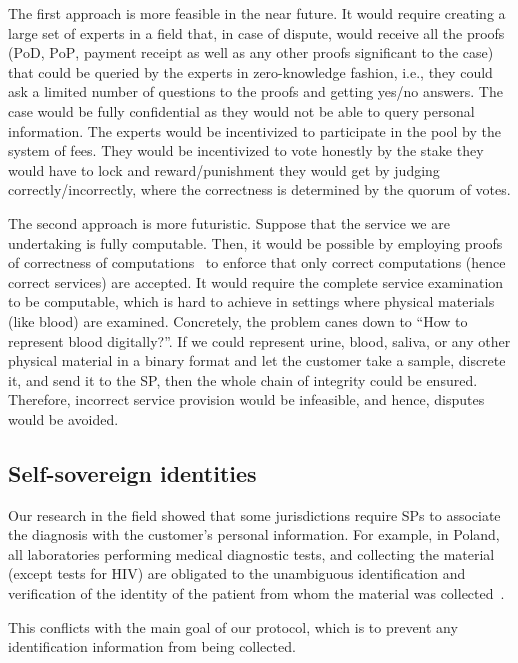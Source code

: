 \documentclass[pdftex,twocolumn,epjc3]{svjour3}
\begin{document}
{The first approach is more feasible in the near future. It would require creating a large set of experts in a field that, in case of dispute, would receive all the proofs ($\mathrm{PoD}$, $\mathrm{PoP}$, payment $\mathrm{receipt}$ as well as any other proofs significant to the case) that could be queried by the experts in zero-knowledge fashion, i.e., they could ask a limited number of questions to the proofs and getting yes/no answers. The case would be fully confidential as they would not be able to query personal information. The experts would be incentivized to participate in the pool by the system of fees. They would be incentivized to vote honestly by the stake they would have to lock and reward/punishment they would get by judging correctly/incorrectly, where the correctness is determined by the quorum of votes.

The second approach is more futuristic. Suppose that the service we are undertaking is fully computable. Then, it would be possible by employing proofs of correctness of computations~\cite{ben-sassonSNARKsVerifyingProgram2013} to enforce that only correct computations (hence correct services) are accepted. It would require the complete service examination to be computable, which is hard to achieve in settings where physical materials (like blood) are examined. Concretely, the problem canes down to ``How to represent blood digitally?''. If we could represent urine, blood, saliva, or any other physical material in a binary format and let the customer take a sample, discrete it, and send it to the SP, then the whole chain of integrity could be ensured. Therefore, incorrect service provision would be infeasible, and hence, disputes would be avoided.

\subsection{Self-sovereign identities}
Our research in the field showed that some jurisdictions require SPs to associate the diagnosis with the customer's personal information. For example, in Poland, all laboratories performing medical diagnostic tests, and collecting the material (except tests for HIV) are obligated to the unambiguous identification and verification of the identity of the patient from whom the material was collected~\cite{ministerstwozdrowiaRegulationMinisterHealth2006}.

This conflicts with the main goal of our protocol, which is to prevent any identification information from being collected.

}
\end{document}
